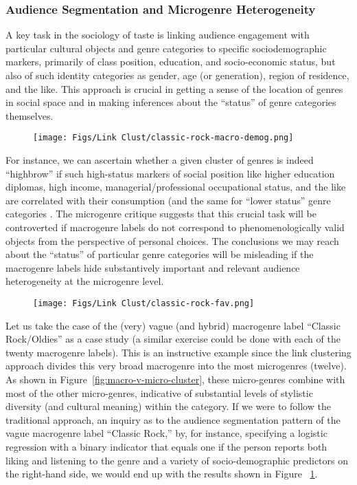  \subsubsection{Audience Segmentation and Microgenre Heterogeneity}
 A key task in the sociology of taste is linking audience engagement with particular cultural objects and genre categories to specific sociodemographic markers, primarily of class position, education, and socio-economic status, but also of such identity categories as gender, age (or generation), region of residence, and the like. This approach is crucial in getting a sense of the location of genres in social space and in making inferences about the ``status'' of genre categories themselves. 

\begin{figure}[ht!]
    \centering
    \texttt{[image: Figs/Link Clust/classic-rock-macro-demog.png]}
    \caption{}
    \label{fig:classic-rock-main}
\end{figure}
 
For instance, we can ascertain whether a given cluster of genres is indeed ``highbrow'' if such high-status markers of social position like higher education diplomas, high income, managerial/professional occupational status, and the like are correlated with their consumption (and the same for ``lower status'' genre categories \citep{bryson96}. The microgenre critique suggests that this crucial task will be controverted if macrogenre labels do not correspond to phenomenologically valid objects from the perspective of personal choices. The conclusions we may reach about the ``status'' of particular genre categories will be misleading if the macrogenre labels hide substantively important and relevant audience heterogeneity at the microgenre level.

\begin{figure}[ht!]
    \centering
    \texttt{[image: Figs/Link Clust/classic-rock-fav.png]}
    \caption{}
    \label{fig:fav}
\end{figure}

Let us take the case of the (very) vague (and hybrid) macrogenre label ``Classic Rock/Oldies'' as a case study (a similar exercise could be done with each of the twenty macrogenre labels). This is an instructive example since the link clustering approach divides this very broad macrogenre into the most microgenres (twelve). As shown in Figure~\ref{fig:macro-v-micro-cluster}, these micro-genres combine with most of the other micro-genres, indicative of substantial levels of stylistic diversity (and cultural meaning) within the category. If we were to follow the traditional approach, an inquiry as to the audience segmentation pattern of the vague macrogenre label ``Classic Rock,'' by, for instance, specifying a logistic regression with a binary indicator that equals one if the person reports both liking and listening to the genre and a variety of socio-demographic predictors on the right-hand side, we would end up with the results shown in Figure ~\ref{fig:classic-rock-main}. 

